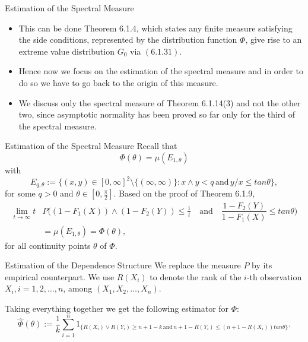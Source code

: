 \documentclass[11pt]{beamer}
\begin{document}
\begin{frame}{Estimation of the Spectral Measure}
\begin{itemize}
\item This can be done Theorem 6.1.4, which states any finite measure satisfying the side conditions, represented by the distribution function $\Phi$, give rise to an extreme value distribution $G_0$ via $(6.1.31)$.
\item Hence now we focus on the estimation of the spectral measure and in order to do so we have to go back to    the origin of this measure.
\item We discuss only the spectral measure of Theorem 6.1.14(3) and not the other two, since asymptotic normality has been proved so far only for the third of the spectral measure.
\end{itemize}
\end{frame}

\begin{frame}{Estimation of the Spectral Measure}
Recall that 
\begin{displaymath}
\Phi(\theta)=\mu(E_{1,\theta})
\end{displaymath}
with
\begin{displaymath}
E_{q,\theta}:=\{ (x,y)\in [0,\infty]^2\setminus \{ (\infty,\infty)\} : x\land y<q \,\text{and}\, y/x \le tan \theta \},
\end{displaymath}
for some $q>0$ and $\theta \in [0,\frac{\pi}{2}]$.
Based on the proof of Theorem 6.1.9,
\begin{displaymath}
\begin{split}
\lim_{t\to \infty} t &P\big ( (1-F_1(X))\land (1-F_2(Y)) \le \frac{1}{t} \quad \text{and} \quad \dfrac{1-F_2(Y)}{1-F_1(X)}\le tan \theta\big) \\
&=\mu(E_{1,\theta})=\Phi(\theta),
\end{split}
\end{displaymath}
for all continuity points $\theta$ of $\Phi$.
\end{frame}
\begin{frame}{Estimation of the Dependence Structure}
We replace the measure $P$ by its empirical counterpart. We use $R(X_i)$ to denote the rank of the $i$-th observation $X_i, i=1,2,\dots,n$, among $(X_1,X_2,\dots, X_n)$.\par 
Taking everything together we get the following estimator for $\Phi$:
\begin{displaymath}
\hat{\Phi}(\theta):=\frac{1}{k} \sum_{i=1}^n 1_{\{ R(X_i) \lor R(Y_i) \ge n+1-k\, \text{and} \, n+1-R(Y_i)\le (n+1-R(X_i)) tan \theta \}}.
\end{displaymath}

\end{frame}
\end{document}
